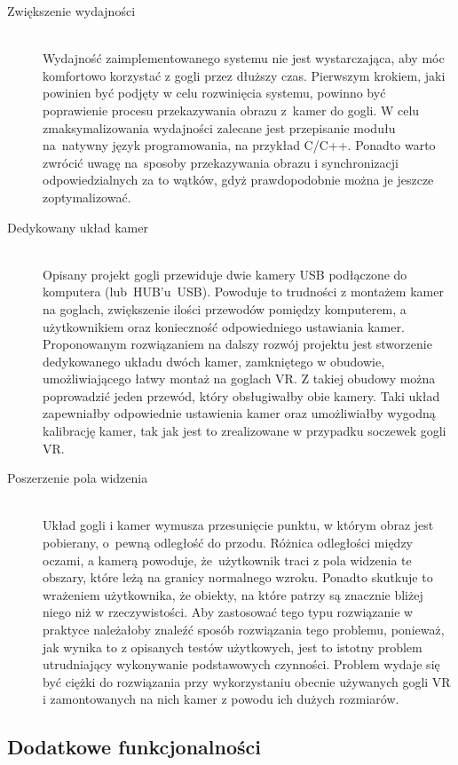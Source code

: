 \documentclass[a4paper,11pt,twoside]{report}
\theoremstyle{definition}
\begin{document}
\begin{description}
\item [Zwiększenie wydajności] \hfill \\
Wydajność zaimplementowanego systemu nie jest wystarczająca, aby móc komfortowo korzystać z gogli przez dłuższy czas. Pierwszym krokiem, jaki powinien być podjęty w celu rozwinięcia systemu, powinno być poprawienie procesu przekazywania obrazu z~kamer do gogli. W celu zmaksymalizowania wydajności zalecane jest przepisanie modułu na~natywny język programowania, na przykład C/C++. Ponadto warto zwrócić uwagę na~sposoby przekazywania obrazu i synchronizacji odpowiedzialnych za to wątków, gdyż prawdopodobnie można je jeszcze zoptymalizować.

\item [Dedykowany układ kamer] \hfill \\
Opisany projekt gogli przewiduje dwie kamery USB podłączone do komputera (lub~HUB'u~USB). Powoduje to trudności z montażem kamer na goglach, zwiększenie ilości przewodów pomiędzy komputerem, a użytkownikiem oraz konieczność odpowiedniego ustawiania kamer. Proponowanym rozwiązaniem na dalszy rozwój projektu jest stworzenie dedykowanego układu dwóch kamer, zamkniętego w obudowie, umożliwiającego łatwy montaż na goglach VR. Z takiej obudowy można poprowadzić jeden przewód, który obsługiwałby obie kamery. Taki układ zapewniałby odpowiednie ustawienia kamer oraz umożliwiałby wygodną kalibrację kamer, tak jak jest to zrealizowane w przypadku soczewek gogli VR.

\item [Poszerzenie pola widzenia] \hfill \\
Układ gogli i kamer wymusza przesunięcie punktu, w którym obraz jest pobierany, o~pewną odległość do przodu. Różnica odległości między oczami, a kamerą powoduje, że~użytkownik traci z pola widzenia te obszary, które leżą na granicy normalnego wzroku. Ponadto skutkuje to wrażeniem użytkownika, że obiekty, na które patrzy są znacznie bliżej niego niż w rzeczywistości. Aby zastosować tego typu rozwiązanie w praktyce należałoby znaleźć sposób rozwiązania tego problemu, ponieważ, jak wynika to z opisanych testów użytkowych, jest to istotny problem utrudniający wykonywanie podstawowych czynności. Problem wydaje się być ciężki do rozwiązania przy wykorzystaniu obecnie używanych gogli VR i zamontowanych na nich kamer z powodu ich dużych rozmiarów.
\end{description}

\subsection{Dodatkowe funkcjonalności}
\end{document}
